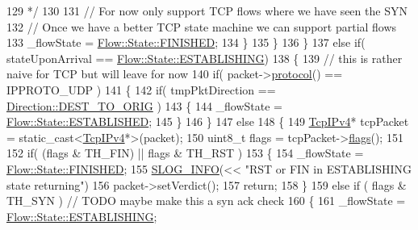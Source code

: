 \begin{DoxyCode}
129 \textcolor{comment}{                */}
130             
131                 \textcolor{comment}{// For now only support TCP flows where we have seen the SYN}
132                 \textcolor{comment}{// Once we have a better TCP state machine we can support partial flows}
133                 \_flowState = \hyperlink{class_vsid_common_1_1_flow_a4c78d7517903031a861c7287e706a6c2a2c616b2713e2e0aed04b4c4752c88133}{Flow::State::FINISHED};
134             \}
135         \}
136     \}
137     \textcolor{keywordflow}{else} \textcolor{keywordflow}{if}( stateUponArrival == \hyperlink{class_vsid_common_1_1_flow_a4c78d7517903031a861c7287e706a6c2afdb7bfdb2e03442a306fe07f152f91fc}{Flow::State::ESTABLISHING})
138     \{
139         \textcolor{comment}{// this is rather naive for TCP but will leave for now}
140         \textcolor{keywordflow}{if}( packet->\hyperlink{class_vsid_common_1_1_i_pv4_packet_ac1ff979633726d9f558bce1210595879}{protocol}() == IPPROTO\_UDP )
141         \{
142             \textcolor{keywordflow}{if}( tmpPktDirection == \hyperlink{class_vsid_common_1_1_flow_a82b0cd313a915325b97133fd8e104781acec4e9f5cd57d2a319a172cba0a6d505}{Direction::DEST\_TO\_ORIG} )
143             \{
144                 \_flowState = \hyperlink{class_vsid_common_1_1_flow_a4c78d7517903031a861c7287e706a6c2a7640f170af693e00a6c91df543aa2b76}{Flow::State::ESTABLISHED};
145             \}
146         \}
147         \textcolor{keywordflow}{else}
148         \{
149             \hyperlink{class_vsid_common_1_1_tcp_i_pv4}{TcpIPv4}* tcpPacket = \textcolor{keyword}{static\_cast<}\hyperlink{class_vsid_common_1_1_tcp_i_pv4}{TcpIPv4}*\textcolor{keyword}{>}(packet);
150             uint8\_t flags = tcpPacket->\hyperlink{class_vsid_common_1_1_tcp_i_pv4_adb5c52a0772cf3bd53c41702b877b7d1}{flags}();
151 
152             \textcolor{keywordflow}{if}( (flags & TH\_FIN) || flags & TH\_RST )
153             \{
154                 \_flowState = \hyperlink{class_vsid_common_1_1_flow_a4c78d7517903031a861c7287e706a6c2a2c616b2713e2e0aed04b4c4752c88133}{Flow::State::FINISHED};
155                 \hyperlink{_logger_8h_a119c1c29ba35a8db38e2358e41167282}{SLOG\_INFO}(<< \textcolor{stringliteral}{"RST or FIN in ESTABLISHING state returning"})
156                 packet->setVerdict();
157                 return;
158             \}
159             else if ( flags & TH\_SYN ) \textcolor{comment}{// TODO maybe make this a syn ack check}
160             \{
161                 \_flowState = \hyperlink{class_vsid_common_1_1_flow_a4c78d7517903031a861c7287e706a6c2afdb7bfdb2e03442a306fe07f152f91fc}{Flow::State::ESTABLISHING};

\end{DoxyCode}
